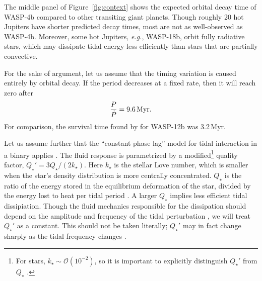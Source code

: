 \documentclass[12pt,twocolumn,tighten]{aastex62}
\begin{document}
The middle panel of Figure~\ref{fig:context} shows the expected
orbital decay time of WASP-4b compared to other transiting giant
planets.  Though roughly 20 hot Jupiters have shorter predicted decay
times, most are not as well-observed as WASP-4b. Moreover, some hot
Jupiters, {\it e.g.}, WASP-18b, orbit fully radiative stars, which may
dissipate tidal energy less efficiently than stars that are partially
convective.

For the sake of argument, let us assume that the timing variation is
caused entirely by orbital decay.  If the period decreases
at a fixed rate, then it will reach zero after
\begin{equation}
  \frac{P}{ \dot{P} } = 9.6 \, {\rm Myr}.
\end{equation}
For comparison, the survival time found by \citet{patra_2017} for
WASP-12b was 3.2\,Myr.

Let us assume further that the ``constant phase lag'' model for tidal
interaction in a binary applies \citep{zahn_tidal_1977}.  The fluid
response is parametrized by a modified\footnote{For stars, $k_\star
\sim \mathcal{O}(10^{-2})$, so it is important to explicitly
distinguish $Q_\star'$ from $Q_\star$ \citep[{\it
e.g.},][]{schwarzschild_structure_1958}.} quality factor, $Q_\star' =
3 Q_\star / (2k_\star)$.  Here $k_\star$ is the stellar Love number,
which is smaller when the star's density distribution is more
centrally concentrated. $Q_\star$ is the ratio of the energy stored in
the equilibrium deformation of the star, divided by the energy lost to
heat per tidal period \citep[{\it e.g.},][]{goldreich_q_1966}.  A
larger $Q_\star$ implies less efficient tidal dissipiation.  Though
the fluid mechanics responsible for the dissipation should depend on
the amplitude and frequency of the tidal perturbation
\citep[][Section~3.3]{ogilvie_tidal_2014}, we will treat $Q_\star'$ as
a constant.  This should not be taken literally; $Q_\star'$ may in
fact change sharply as the tidal frequency changes
\citep{penev_empirical_2018}.
\end{document}
